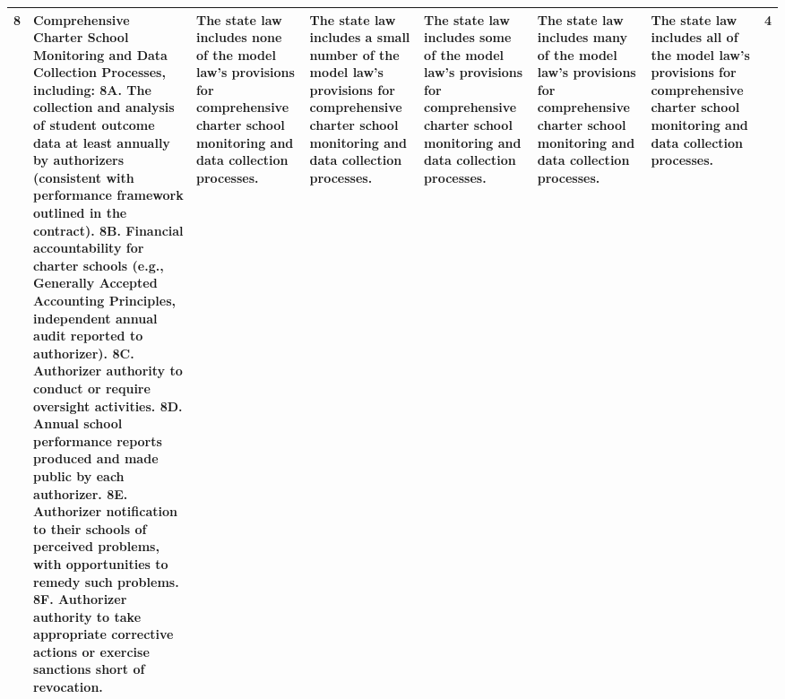 {\begin{longtable}{rp{2.2in}p{0.9in}p{0.9in}p{0.9in}p{0.9in}p{0.9in}c}
   \hline
  8 & Comprehensive Charter School Monitoring and Data Collection Processes, including: 8A. The collection and analysis of student outcome data at least annually by authorizers (consistent with performance framework outlined in the contract). 8B. Financial accountability for charter schools (e.g., Generally Accepted Accounting Principles, independent annual audit reported to authorizer). 8C. Authorizer authority to conduct or require oversight activities. 8D. Annual school performance reports produced and made public by each authorizer. 8E. Authorizer notification to their schools of perceived problems, with opportunities to remedy such problems. 8F. Authorizer authority to take appropriate corrective actions or exercise sanctions short of revocation. & The state law includes none of the model law’s provisions for comprehensive charter school monitoring and data collection processes.  & The state law includes a small number of the model law’s provisions for comprehensive charter school monitoring and data collection processes.  & The state law includes some of the model law’s provisions for comprehensive charter school monitoring and data collection processes.  & The state law includes many of the model law’s provisions for comprehensive charter school monitoring and data collection processes.  & The state law includes all of the model law’s provisions for comprehensive charter school monitoring and data collection processes.  &   4 \\ 
   \hline

\end{longtable}}
